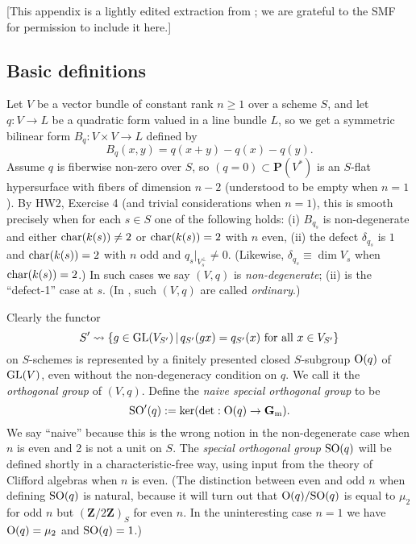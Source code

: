 \documentclass[10pt]{article}
\renewcommand{\(}{\left(}
\renewcommand{\)}{\right)}
\numberwithin{thm}{subsection}
\begin{document}
[This appendix is a lightly edited extraction from \cite[App.\,C]{luminy}; we are grateful to the SMF for permission
to include it here.]

\subsection{Basic definitions}\label{oversec}

Let $V$ be a vector bundle of constant rank $n \ge 1$ over a 
scheme $S$, and let $q:V \rightarrow L$ be a quadratic form valued in a line bundle $L$, 
so we get a symmetric bilinear form $B_q:V \times V \rightarrow L$ defined by
$$B_q(x,y) = q(x+y) - q(x) - q(y).$$
Assume $q$ is fiberwise  non-zero over $S$, so 
$(q = 0) \subset \mathbf{P}(V^{\ast})$ is an $S$-flat hypersurface with fibers of dimension $n-2$
(understood to be empty when $n = 1$).
By HW2, Exercise 4 (and trivial considerations when $n = 1$), this is smooth
precisely when for each $s \in S$ one of the following holds: (i) $B_{q_s}$ is non-degenerate and either 
${\rm{char}}(k(s)) \ne 2$ or
${\rm{char}}(k(s)) = 2$ with $n$ even, (ii) the defect $\delta_{q_s}$ is $1$ and 
${\rm{char}}(k(s)) = 2$ with $n$ odd and $q_s|_{V_s^{\perp}} \ne 0$. 
(Likewise, $\delta_{q_s} \equiv \dim V_s$ when
${\rm{char}}(k(s)) = 2$.) 
 In such cases we say $(V,q)$ is {\em non-degenerate};
(ii) is the ``defect-1'' case at $s$. 
(In \cite[XII, \S1]{sga7}, such $(V,q)$ are called {\em ordinary}.)

Clearly the functor 
$$S' \rightsquigarrow  \{g \in {\rm{GL}}(V_{S'})\,|\,q_{S'}(gx) = q_{S'}(x) \mbox{ for all } x \in V_{S'}\}$$
on $S$-schemes is represented by a 
finitely presented closed $S$-subgroup ${\rm{O}}(q)$ of ${\rm{GL}}(V)$, even without
the non-degeneracy condition on $q$. We call it the {\em orthogonal group} of $(V,q)$.
Define the {\em naive special orthogonal group} to be 
$${\rm{SO}}'(q) := \ker(\det:{\rm{O}}(q) \rightarrow {\mathbf{G}}_{\rm{m}}).$$
We say ``naive'' because this is the wrong notion
in the non-degenerate case when $n$ is even
and 2 is not a unit on $S$.
The {\em special orthogonal group} ${\rm{SO}}(q)$ will be defined shortly
in a characteristic-free way, using 
input from the theory of Clifford algebras when $n$ is even.
(The distinction between
 even and odd $n$ when defining ${\rm{SO}}(q)$ is natural, because
 it will turn out that ${\rm{O}}(q)/{\rm{SO}}(q)$ is equal to $\mu_2$ for odd
 $n$ but $({\mathbf{Z}}/2{\mathbf{Z}})_S$ for even $n$. In the uninteresting case
 $n = 1$ we have ${\rm{O}}(q) = \mu_2$
 and ${\rm{SO}}(q) = 1$.)
     
\end{document}
